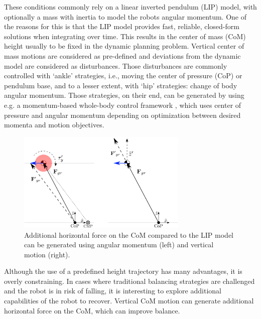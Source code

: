 \documentclass[letterpaper, 10 pt, conference]{ieeeconf}  %
\begin{document}
These conditions commonly rely on a linear inverted pendulum (LIP) model, with optionally a mass with inertia to model the robots angular momentum. One of the reasons for this is that the LIP model provides fast, reliable, closed-form solutions when integrating over time. This results in the center of mass (CoM) height usually to be fixed in the dynamic planning problem. Vertical center of mass motions are considered as pre-defined and deviations from the dynamic model are considered as disturbances. Those disturbances are commonly controlled with `ankle' strategies, i.e., moving the center of pressure (CoP) or pendulum base, and to a lesser extent, with `hip' strategies: change of body angular momentum. Those strategies, on their end, can be generated by using e.g. a momentum-based whole-body control framework \cite{kajita2003resolved, lee2012momentum,koolen2016design}, which uses center of pressure and angular momentum depending on optimization between desired momenta and motion objectives.

\begin{figure}[h]
      \centering
      \includegraphics[width=3.2in]{modelvarzvsang3.png} %
      \caption{Additional horizontal force on the CoM compared to the LIP model can be generated using angular momentum (left) and vertical motion (right). }
      \label{fig:angvsvarz}
\end{figure}

Although the use of a predefined height trajectory has many advantages, it is overly constraining. In cases where traditional balancing strategies are challenged and the robot is in risk of falling, it is interesting to explore additional capabilities of the robot to recover. Vertical CoM motion can generate additional horizontal force on the CoM, which can improve balance.
\end{document}
